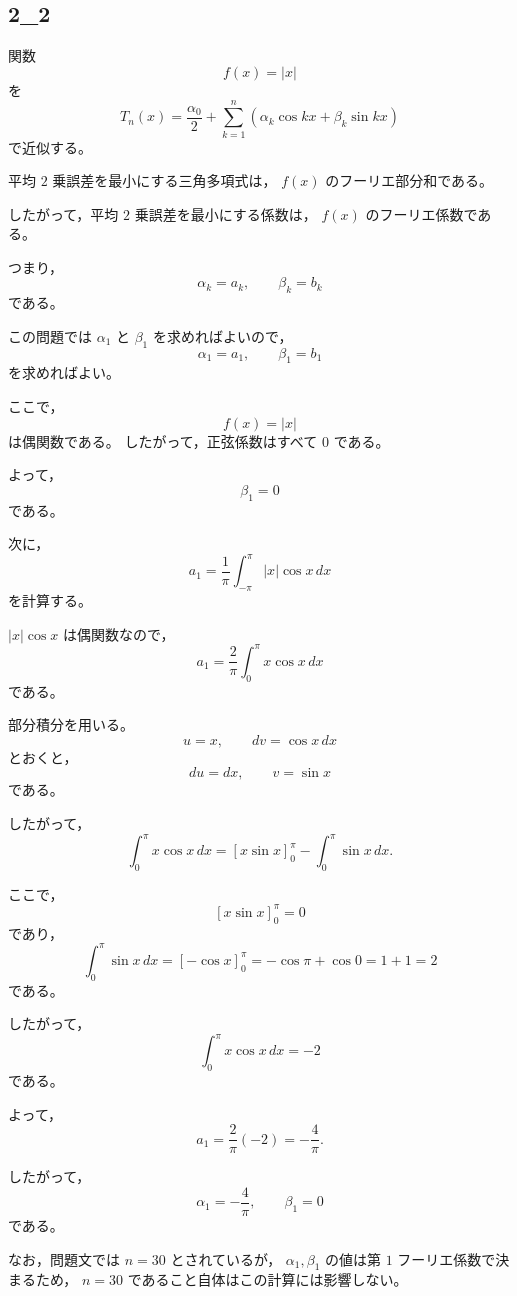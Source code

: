 
\subsection{2_2}
\begin{solution}
	関数
	\[
	f(x)=|x|
	\]
	を
	\[
	T_n(x)
	=
	\frac{\alpha_0}{2}
	+
	\sum_{k=1}^{n}
	\left(
	\alpha_k\cos kx+\beta_k\sin kx
	\right)
	\]
	で近似する。
	
	平均 \(2\) 乗誤差を最小にする三角多項式は，
	\(f(x)\) のフーリエ部分和である。
	
	したがって，平均 \(2\) 乗誤差を最小にする係数は，
	\(f(x)\) のフーリエ係数である。
	
	つまり，
	\[
	\alpha_k=a_k,
	\qquad
	\beta_k=b_k
	\]
	である。
	
	この問題では \(\alpha_1\) と \(\beta_1\) を求めればよいので，
	\[
	\alpha_1=a_1,
	\qquad
	\beta_1=b_1
	\]
	を求めればよい。
	
	ここで，
	\[
	f(x)=|x|
	\]
	は偶関数である。
	したがって，正弦係数はすべて \(0\) である。
	
	よって，
	\[
	\beta_1=0
	\]
	である。
	
	次に，
	\[
	a_1
	=
	\frac{1}{\pi}
	\int_{-\pi}^{\pi}
	|x|\cos x\,dx
	\]
	を計算する。
	
	\(|x|\cos x\) は偶関数なので，
	\[
	a_1
	=
	\frac{2}{\pi}
	\int_0^\pi x\cos x\,dx
	\]
	である。
	
	部分積分を用いる。
	\[
	u=x,\qquad dv=\cos x\,dx
	\]
	とおくと，
	\[
	du=dx,\qquad v=\sin x
	\]
	である。
	
	したがって，
	\[
	\int_0^\pi x\cos x\,dx
	=
	[x\sin x]_0^\pi
	-
	\int_0^\pi \sin x\,dx.
	\]
	
	ここで，
	\[
	[x\sin x]_0^\pi=0
	\]
	であり，
	\[
	\int_0^\pi \sin x\,dx
	=
	[-\cos x]_0^\pi
	=
	-\cos\pi+\cos 0
	=
	1+1
	=
	2
	\]
	である。
	
	したがって，
	\[
	\int_0^\pi x\cos x\,dx=-2
	\]
	である。
	
	よって，
	\[
	a_1
	=
	\frac{2}{\pi}(-2)
	=
	-\frac{4}{\pi}.
	\]
	
	したがって，
	\[
	\boxed{
		\alpha_1=-\frac{4}{\pi},
		\qquad
		\beta_1=0
	}
	\]
	である。
	
	なお，問題文では \(n=30\) とされているが，
	\(\alpha_1,\beta_1\) の値は第 \(1\) フーリエ係数で決まるため，
	\(n=30\) であること自体はこの計算には影響しない。
\end{solution}